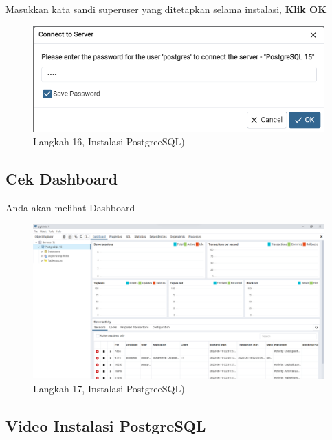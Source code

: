 \documentclass[
]{book}
\begin{document}
Masukkan kata sandi superuser yang ditetapkan selama instalasi, \textbf{Klik OK}

\begin{figure}

{\centering \includegraphics[width=1\linewidth]{./images/Bab1/Postgree15} 

}

\caption{Langkah 16, Instalasi PostgreeSQL)}\label{fig:install-posrgree16}
\end{figure}

\hypertarget{cek-dashboard}{%
\subsection{Cek Dashboard}\label{cek-dashboard}}

Anda akan melihat Dashboard

\begin{figure}

{\centering \includegraphics[width=1\linewidth]{./images/Bab1/Postgree16} 

}

\caption{Langkah 17, Instalasi PostgreeSQL)}\label{fig:install-posrgree17}
\end{figure}

\hypertarget{video-instalasi-postgresql}{%
\subsection{Video Instalasi PostgreSQL}\label{video-instalasi-postgresql}}
\end{document}
